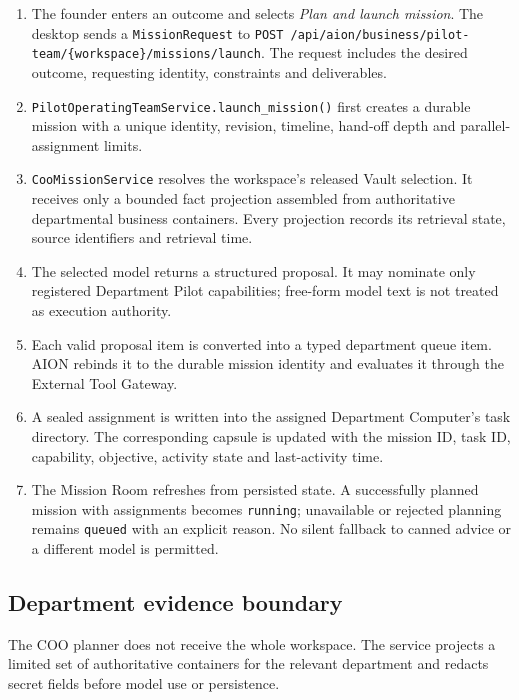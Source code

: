 \begin{enumerate}[leftmargin=*]
\item The founder enters an outcome and selects \emph{Plan and launch
mission}. The desktop sends a \texttt{MissionRequest} to
\texttt{POST /api/aion/business/pilot-team/\{workspace\}/missions/launch}.
The request includes the desired outcome, requesting identity, constraints and
deliverables.
\item \texttt{PilotOperatingTeamService.launch\_mission()} first creates a
durable mission with a unique identity, revision, timeline, hand-off depth and
parallel-assignment limits.
\item \texttt{CooMissionService} resolves the workspace's released Vault
selection. It receives only a bounded fact projection assembled from
authoritative departmental business containers. Every projection records its
retrieval state, source identifiers and retrieval time.
\item The selected model returns a structured proposal. It may nominate only
registered Department Pilot capabilities; free-form model text is not treated
as execution authority.
\item Each valid proposal item is converted into a typed department queue
item. AION rebinds it to the durable mission identity and evaluates it through
the External Tool Gateway.
\item A sealed assignment is written into the assigned Department Computer's
task directory. The corresponding capsule is updated with the mission ID,
task ID, capability, objective, activity state and last-activity time.
\item The Mission Room refreshes from persisted state. A successfully planned
mission with assignments becomes \texttt{running}; unavailable or rejected
planning remains \texttt{queued} with an explicit reason. No silent fallback
to canned advice or a different model is permitted.
\end{enumerate}

\subsection*{Department evidence boundary}

The COO planner does not receive the whole workspace. The service projects a
limited set of authoritative containers for the relevant department and
redacts secret fields before model use or persistence.

